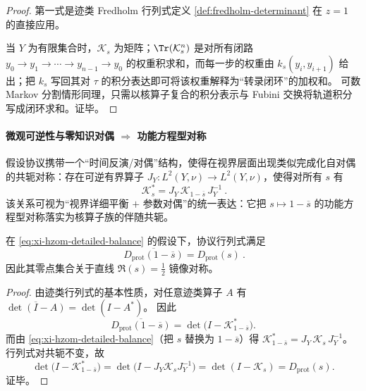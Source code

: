 \begin{proof}
第一式是迹类 Fredholm 行列式定义 \ref{def:fredholm-determinant} 在 \(z=1\) 的直接应用。
\par
当 \(Y\) 为有限集合时，\(\mathcal{K}_s\) 为矩阵；\(\Tr(\mathcal{K}_s^{n})\) 是对所有闭路
\(
y_0\to y_1\to\cdots\to y_{n-1}\to y_0
\)
的权重积求和，而每一步的权重由 \(k_s(y_i,y_{i+1})\) 给出；把 \(k_s\) 写回其对 \(\tau\) 的积分表达即可将该权重解释为“转录闭环”的加权和。
可数 Markov 分割情形同理，只需以核算子复合的积分表示与 Fubini 交换将轨道积分写成闭环求和。证毕。
\end{proof}

\paragraph{微观可逆性与零知识对偶 \texorpdfstring{$\Rightarrow$}{=>} 功能方程型对称}
假设协议携带一个“时间反演/对偶”结构，使得在视界层面出现类似完成化自对偶的共轭对称：存在可逆有界算子 \(J_Y:L^2(Y,\nu)\to L^2(Y,\nu)\)，使得对所有 \(s\) 有
\begin{equation}\label{eq:xi-hzom-detailed-balance}
\boxed{\ \mathcal{K}_s^{*}=J_Y\,\mathcal{K}_{1-\overline{s}}\,J_Y^{-1}\ }.
\end{equation}
该关系可视为“视界详细平衡 \(+\) 参数对偶”的统一表达：它把 \(s\mapsto 1-\overline{s}\) 的功能方程型对称落实为核算子族的伴随共轭。

\begin{proposition}[详细平衡共轭 \texorpdfstring{$\Rightarrow$}{=>} 行列式反射对称]\label{prop:xi-hzom-functional-equation}
在 \eqref{eq:xi-hzom-detailed-balance} 的假设下，协议行列式满足
\[
\boxed{\ \overline{D_{\mathrm{prot}}(1-\overline{s})}=D_{\mathrm{prot}}(s)\ }.
\]
因此其零点集合关于直线 \(\Re(s)=\tfrac12\) 镜像对称。
\end{proposition}

\begin{proof}
由迹类行列式的基本性质，对任意迹类算子 \(A\) 有 \(\overline{\det(I-A)}=\det(I-A^{*})\)。
因此
\[
\overline{D_{\mathrm{prot}}(1-\overline{s})}
=\det\!\bigl(I-\mathcal{K}_{1-\overline{s}}^{*}\bigr).
\]
而由 \eqref{eq:xi-hzom-detailed-balance}（把 \(s\) 替换为 \(1-\overline{s}\)）得
\(
\mathcal{K}_{1-\overline{s}}^{*}=J_Y\,\mathcal{K}_{s}\,J_Y^{-1}
\)。
行列式对共轭不变，故
\[
\det\!\bigl(I-\mathcal{K}_{1-\overline{s}}^{*}\bigr)
=
\det\!\bigl(I-J_Y\mathcal{K}_sJ_Y^{-1}\bigr)
=
\det(I-\mathcal{K}_s)
=D_{\mathrm{prot}}(s).
\]
证毕。
\end{proof}

